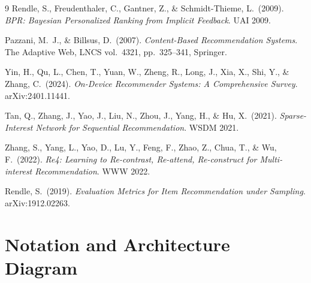 \documentclass{article}
\begin{document}
\begin{thebibliography}{9}
Rendle, S., Freudenthaler, C., Gantner, Z., \& Schmidt-Thieme, L.\ (2009).
\textit{BPR: Bayesian Personalized Ranking from Implicit Feedback}. UAI 2009.

Pazzani, M.\ J., \& Billsus, D.\ (2007).
\textit{Content-Based Recommendation Systems}. The Adaptive Web, LNCS vol.\ 4321, pp.\ 325--341, Springer.

Yin, H., Qu, L., Chen, T., Yuan, W., Zheng, R., Long, J., Xia, X., Shi, Y., \& Zhang, C.\ (2024).
\textit{On-Device Recommender Systems: A Comprehensive Survey}. arXiv:2401.11441.

Tan, Q., Zhang, J., Yao, J., Liu, N., Zhou, J., Yang, H., \& Hu, X.\ (2021).
\textit{Sparse-Interest Network for Sequential Recommendation}. WSDM 2021.

Zhang, S., Yang, L., Yao, D., Lu, Y., Feng, F., Zhao, Z., Chua, T., \& Wu, F.\ (2022).
\textit{Re4: Learning to Re-contrast, Re-attend, Re-construct for Multi-interest Recommendation}. WWW 2022.

Rendle, S.\ (2019).
\textit{Evaluation Metrics for Item Recommendation under Sampling}. arXiv:1912.02263.

\end{thebibliography}

\appendix
\raggedbottom  %

\section{Notation and Architecture Diagram}
\label{app:notation}
\end{document}
